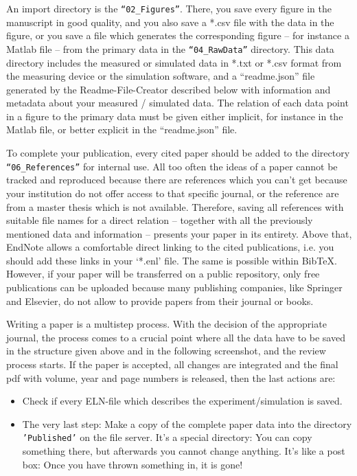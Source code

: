 An import directory is the \texttt{“02\_Figures”}. There, you save every figure
in the manuscript in good quality, and you also save a *.csv file with the data
in the figure, or you save a file which generates the corresponding figure –
for instance a Matlab file – from the primary data in the \texttt{“04\_RawData”}
directory. This data directory includes the measured or simulated data in *.txt
or *.csv format from the measuring device or the simulation software, and a
“readme.json” file generated by the Readme-File-Creator described below with
information and metadata about your measured / simulated data. The relation of
each data point in a figure to the primary data must be given either implicit,
for instance in the Matlab file, or better explicit in the “readme.json” file.

To complete your publication, every cited paper should be added to the directory
\texttt{“06\_References”} for internal use. All too often the ideas of a paper
cannot be tracked and reproduced because there are references which you can’t
get because your institution do not offer access to that specific journal, or
the reference are from a master thesis which is not available. Therefore, saving
all references with suitable file names for a direct relation – together with
all the previously mentioned data and information – presents your paper in its
entirety. Above that, EndNote allows a comfortable direct linking to the cited
publications, i.e. you should add these links in your ‘*.enl’ file. The same is
possible within BibTeX. However, if your paper will be transferred on a public
repository, only free publications can be uploaded because many publishing
companies, like Springer and Elsevier, do not allow to provide papers from their
journal or books.

Writing a paper is a multistep process. With the decision of the appropriate
journal, the process comes to a crucial point where all the data have to be
saved in the structure given above and in the following screenshot, and the
review process starts. If the paper is accepted, all changes are integrated
and the final pdf with volume, year and page numbers is released, then the last
actions are:
\begin{itemize}
  \item Check if every ELN-file which describes the experiment/simulation
        is saved.
  \item The very last step: Make a copy of the complete paper data into the
        directory \texttt{’Published’} on the file server. It’s a special
        directory: You can copy something there, but afterwards you cannot
        change anything. It’s like a post box: Once you have thrown something
        in, it is gone!
\end{itemize}

